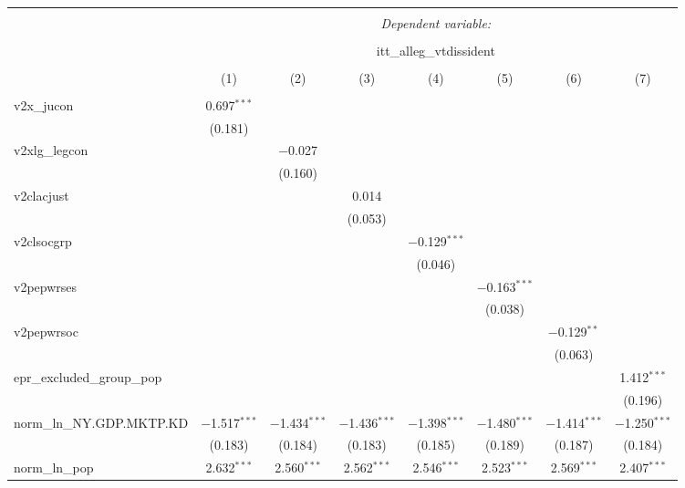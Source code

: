 
\begin{sidewaystable}[!htbp] \centering 
  \caption{} 
  \label{} 
\tiny 
\begin{tabular}{@{\extracolsep{5pt}}lccccccc} 
\\[-1.8ex]\hline 
\hline \\[-1.8ex] 
 & \multicolumn{7}{c}{\textit{Dependent variable:}} \\ 
\cline{2-8} 
\\[-1.8ex] & \multicolumn{7}{c}{itt\_alleg\_vtdissident} \\ 
\\[-1.8ex] & (1) & (2) & (3) & (4) & (5) & (6) & (7)\\ 
\hline \\[-1.8ex] 
 v2x\_jucon & 0.697$^{***}$ &  &  &  &  &  &  \\ 
  & (0.181) &  &  &  &  &  &  \\ 
  v2xlg\_legcon &  & $-$0.027 &  &  &  &  &  \\ 
  &  & (0.160) &  &  &  &  &  \\ 
  v2clacjust &  &  & 0.014 &  &  &  &  \\ 
  &  &  & (0.053) &  &  &  &  \\ 
  v2clsocgrp &  &  &  & $-$0.129$^{***}$ &  &  &  \\ 
  &  &  &  & (0.046) &  &  &  \\ 
  v2pepwrses &  &  &  &  & $-$0.163$^{***}$ &  &  \\ 
  &  &  &  &  & (0.038) &  &  \\ 
  v2pepwrsoc &  &  &  &  &  & $-$0.129$^{**}$ &  \\ 
  &  &  &  &  &  & (0.063) &  \\ 
  epr\_excluded\_group\_pop &  &  &  &  &  &  & 1.412$^{***}$ \\ 
  &  &  &  &  &  &  & (0.196) \\ 
  norm\_ln\_NY.GDP.MKTP.KD & $-$1.517$^{***}$ & $-$1.434$^{***}$ & $-$1.436$^{***}$ & $-$1.398$^{***}$ & $-$1.480$^{***}$ & $-$1.414$^{***}$ & $-$1.250$^{***}$ \\ 
  & (0.183) & (0.184) & (0.183) & (0.185) & (0.189) & (0.187) & (0.184) \\ 
  norm\_ln\_pop & 2.632$^{***}$ & 2.560$^{***}$ & 2.562$^{***}$ & 2.546$^{***}$ & 2.523$^{***}$ & 2.569$^{***}$ & 2.407$^{***}$ \\ 

\end{tabular}
\end{sidewaystable}
